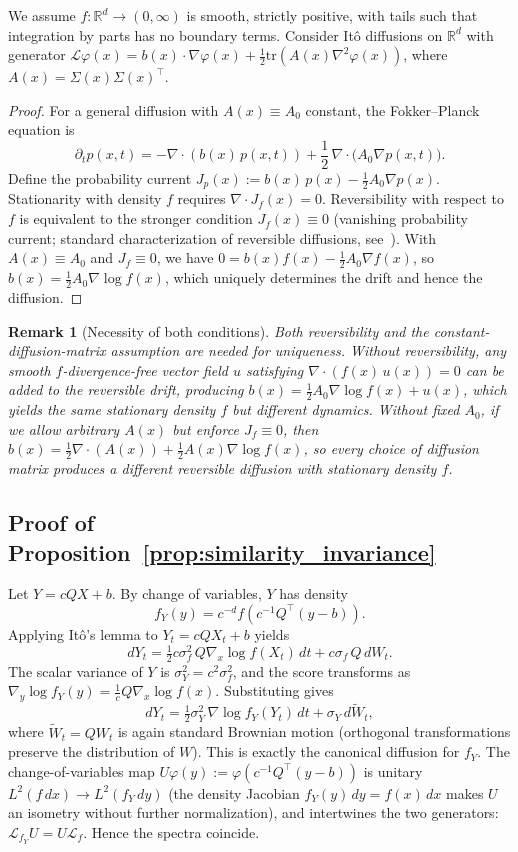 \documentclass{article}
\newcommand{\R}{\mathbb{R}}
\newcommand{\tr}{\mathrm{tr}}
\newtheorem{remark}{Remark}
\begin{document}
We assume $f:\R^d \to (0,\infty)$ is smooth, strictly positive, with tails such that integration by parts has no boundary terms. Consider It\^o diffusions on $\R^d$ with generator $\mathcal{L} \varphi(x) = b(x)\cdot \nabla \varphi(x) + \tfrac{1}{2}\tr(A(x) \nabla^2 \varphi(x))$, where $A(x) = \Sigma(x)\Sigma(x)^\top$.

\begin{proof}
For a general diffusion with $A(x)\equiv A_0$ constant, the Fokker--Planck
equation is
\[
\partial_t p(x,t)
= -\nabla \cdot (b(x)\,p(x,t))
+ \frac{1}{2}\,\nabla \cdot \big(A_0 \nabla p(x,t)\big).
\]
Define the probability current
$J_p(x) := b(x)\,p(x) - \frac{1}{2}A_0 \nabla p(x)$.
Stationarity with density $f$ requires $\nabla \cdot J_f(x) = 0$.
Reversibility with respect to $f$ is equivalent to the stronger condition $J_f(x)\equiv 0$ (vanishing probability current; standard characterization of reversible diffusions, see~\cite[Ch.~4]{Pavliotis2014}).
With $A(x)\equiv A_0$ and $J_f\equiv 0$, we have
$0 = b(x)f(x) - \frac{1}{2}A_0\nabla f(x)$, so
$b(x) = \frac{1}{2}A_0 \nabla \log f(x)$, which uniquely determines the
drift and hence the diffusion.
\end{proof}

\begin{remark}[Necessity of both conditions]
Both reversibility and the constant-diffusion-matrix assumption are needed for uniqueness.
Without reversibility, any smooth $f$-divergence-free vector field $u$ satisfying $\nabla \cdot (f(x)\,u(x)) = 0$ can be added to the reversible drift, producing $b(x) = \frac{1}{2}A_0 \nabla \log f(x) + u(x)$, which yields the same stationary density $f$ but different dynamics.
Without fixed $A_0$, if we allow arbitrary $A(x)$ but enforce $J_f\equiv 0$, then $b(x) = \frac{1}{2}\nabla \cdot (A(x)) + \frac{1}{2}A(x)\nabla \log f(x)$, so every choice of diffusion matrix produces a different reversible diffusion with stationary density $f$.
\end{remark}
\subsection{Proof of Proposition~\ref{prop:similarity_invariance}}
\label{app:similarity_proof}

Let $Y = cQX + b$. By change of variables, $Y$ has density
\[
f_Y(y) = c^{-d} f\!\left(c^{-1} Q^\top (y - b)\right).
\]
Applying It\^o's lemma to $Y_t = cQX_t + b$ yields
\[
dY_t = \tfrac{1}{2} c \sigma_f^2\, Q \nabla_x \log f(X_t)\,dt + c \sigma_f\, Q\,dW_t.
\]
The scalar variance of $Y$ is $\sigma_Y^2 = c^2 \sigma_f^2$, and the score transforms as $\nabla_y \log f_Y(y) = \frac{1}{c} Q \nabla_x \log f(x)$. Substituting gives
\[
dY_t = \tfrac{1}{2} \sigma_Y^2\, \nabla \log f_Y(Y_t)\,dt + \sigma_Y\,d\tilde{W}_t,
\]
where $\tilde{W}_t = Q W_t$ is again standard Brownian motion (orthogonal transformations preserve the distribution of $W$). This is exactly the canonical diffusion for $f_Y$. The change-of-variables map $U\varphi(y) := \varphi(c^{-1}Q^\top(y - b))$ is unitary $L^2(f\,dx) \to L^2(f_Y\,dy)$ (the density Jacobian $f_Y(y)\,dy = f(x)\,dx$ makes $U$ an isometry without further normalization), and intertwines the two generators: $\mathcal{L}_{f_Y} U = U \mathcal{L}_f$. Hence the spectra coincide.
\end{document}
